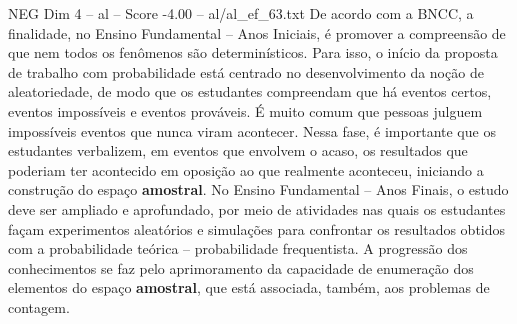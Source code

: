 \begin{textsample}{NEG Dim 4 – al – Score -4.00 – al/al\_ef\_63.txt}
De acordo com a BNCC, a finalidade, no Ensino Fundamental – Anos Iniciais, é promover a compreensão de que nem todos os fenômenos são determinísticos.
Para isso, o início da proposta de trabalho com probabilidade está centrado no desenvolvimento da noção de aleatoriedade, de modo que os estudantes compreendam que há eventos certos, eventos impossíveis e eventos prováveis.
É muito comum que pessoas julguem impossíveis eventos que nunca viram acontecer.
Nessa fase, é importante que os estudantes verbalizem, em eventos que envolvem o acaso, os resultados que poderiam ter acontecido em oposição ao que realmente aconteceu, iniciando a construção do espaço \textbf{amostral}.
No Ensino Fundamental – Anos Finais, o estudo deve ser ampliado e aprofundado, por meio de atividades nas quais os estudantes façam experimentos aleatórios e simulações para confrontar os resultados obtidos com a probabilidade teórica – probabilidade frequentista.
A progressão dos conhecimentos se faz pelo aprimoramento da capacidade de enumeração dos elementos do espaço \textbf{amostral}, que está associada, também, aos problemas de contagem.

\end{textsample}
